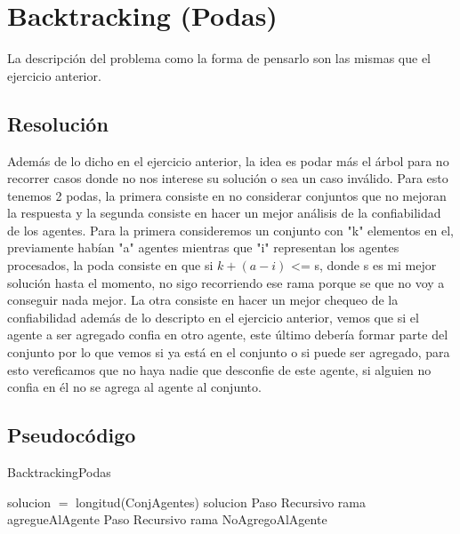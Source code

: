 \section{Backtracking (Podas)}

	La descripción del problema como la forma de pensarlo son las mismas que el ejercicio anterior.

\subsection{Resolución}
	
	Además de lo dicho en el ejercicio anterior, la idea es podar más el árbol para no recorrer casos donde no nos interese su solución o sea un caso inválido. Para esto tenemos 2 podas, la primera consiste en no considerar conjuntos que no mejoran la respuesta y la segunda consiste en hacer un mejor análisis de la confiabilidad de los agentes. Para la primera consideremos un conjunto con "k" elementos en el, previamente habían "a" agentes mientras que "i" representan los agentes procesados, la poda consiste en que si $k+(a-i)$ <= s, donde s es mi mejor solución hasta el momento, no sigo recorriendo ese rama porque se que no voy a conseguir nada mejor. La otra consiste en hacer un mejor chequeo de la confiabilidad además de lo descripto en el ejercicio anterior, vemos que si el agente a ser agregado confia en otro agente, este último debería formar parte del conjunto por lo que vemos si ya está en el conjunto o si puede ser agregado, para esto vereficamos que no haya nadie que desconfie de este agente, si alguien no confia en él no se agrega al agente al conjunto. 
	
\subsection{Pseudocódigo}  
	
\begin{algorithm}[H]
\caption{BacktrackingPodas}\label{Ej1.1}

\begin{algorithmic}[H]
\State solucion $=$ longitud(ConjAgentes)
\EndIf
\State\Return solucion
\EndIf
{}
\State Paso Recursivo rama agregueAlAgente
\EndIf
{}
\State Paso Recursivo rama NoAgregoAlAgente
\EndIf
\EndProcedure
\end{algorithmic}

\end{algorithm}

